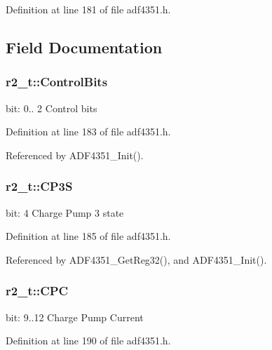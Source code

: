 Definition at line 181 of file adf4351.\+h.



\subsection{Field Documentation}
\subsubsection[{\texorpdfstring{Control\+Bits}{ControlBits}}]{ r2\+\_\+t\+::\+Control\+Bits}\hypertarget{structr2__t_a3afba2088cc33e95e833436e6a111a6a}{}\label{structr2__t_a3afba2088cc33e95e833436e6a111a6a}
bit\+: 0.. 2 Control bits 

Definition at line 183 of file adf4351.\+h.



Referenced by A\+D\+F4351\+\_\+\+Init().

\subsubsection[{\texorpdfstring{C\+P3S}{CP3S}}]{ r2\+\_\+t\+::\+C\+P3S}\hypertarget{structr2__t_a378d00b9682aa05bffb1a3e61da036e4}{}\label{structr2__t_a378d00b9682aa05bffb1a3e61da036e4}
bit\+: 4 Charge Pump 3 state 

Definition at line 185 of file adf4351.\+h.



Referenced by A\+D\+F4351\+\_\+\+Get\+Reg32(), and A\+D\+F4351\+\_\+\+Init().

\subsubsection[{\texorpdfstring{C\+PC}{CPC}}]{ r2\+\_\+t\+::\+C\+PC}\hypertarget{structr2__t_a71530b2c7c16577560cd14f14f320572}{}\label{structr2__t_a71530b2c7c16577560cd14f14f320572}
bit\+: 9..12 Charge Pump Current 

Definition at line 190 of file adf4351.\+h.



